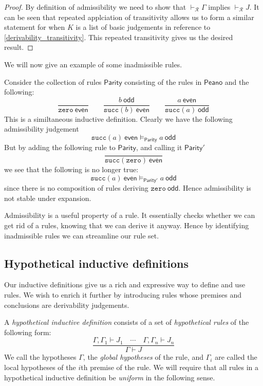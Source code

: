 \begin{proof}
    By definition of admissibility we need to show that $\vdash_{\mathcal{R}} \Gamma$ implies $\vdash_{\mathcal{R}} J$. It can be seen that repeated applciation of transitivity allows us to form a similar statement for when $K$ is a list of basic judgements in reference to \ref{derivability_transitivity}. This repeated transitivity gives us the desired result.
\end{proof}

We will now give an example of some inadmissible rules.

\begin{example}
    Consider the collection of rules $\mathsf{Parity}$ consisting of the rules in $\mathsf{Peano}$ and the following:
    $$
        \frac{}{\texttt{zero}\ \mathsf{even}} \qquad
        \frac{b\ \mathsf{odd}}{\texttt{succ}(b)\ \mathsf{even}} \qquad
        \frac{a\ \mathsf{even}}{\texttt{succ}(a)\ \mathsf{odd}}
    $$
    This is a similtaneous inductive definition. Clearly we have the following admissibility judgement
    $$ \texttt{succ}(a)\ \mathsf{even} \vDash_{\mathsf{Parity}} a\ \mathsf{odd} $$
    But by adding the following rule to $\mathsf{Parity}$, and calling it $\mathsf{Parity}'$
    $$
        \frac{}{\texttt{succ}(\texttt{zero}) \ \mathsf{even}}
    $$
    we see that the following is no longer true:
    $$ \texttt{succ}(a)\ \mathsf{even} \vDash_{\mathsf{Parity'}} a\ \mathsf{odd} $$
    since there is no composition of rules deriving $\texttt{zero}\ \mathsf{odd}$.
    Hence admissibility is not stable under expansion.
\end{example}

\begin{remark}
    Admissibility is a useful property of a rule. It essentially checks whether we can get rid of a rules, knowing that we can derive it anyway. Hence by identifying inadmissible rules we can streamline our rule set.
\end{remark}

\subsection{Hypothetical inductive definitions}

Our inductive definitions give us a rich and expressive way to define and use rules. We wish to enrich it further by introducing rules whose premises and conclusions are derivability judgements.

\begin{defin}
    A \emph{hypothetical inductive definition} consists of a set of \emph{hypothetical rules} of the following form:
    $$
        \frac{\Gamma, \Gamma_1 \vdash J_1 \quad \cdots \quad \Gamma, \Gamma_n \vdash J_n}{\Gamma \vdash J}
    $$
    We call the hypotheses $\Gamma$, the \emph{global hypotheses} of the rule, and $\Gamma_i$ are called the local hypotheses of the $i$th premise of the rule. We will require that all rules in a hypothetical inductive definition be \emph{uniform} in the following sense.
\end{defin}

